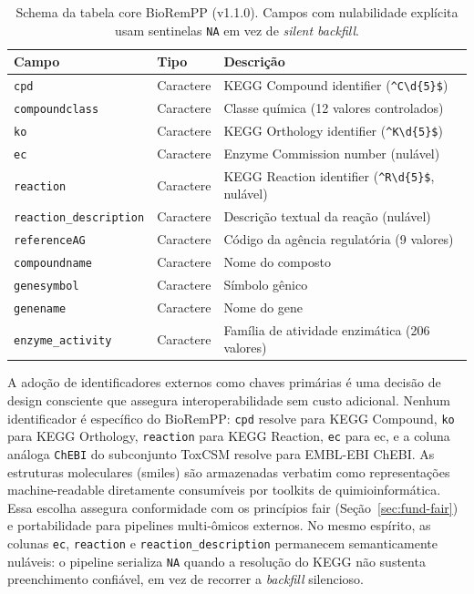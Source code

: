 \begin{table}[htbp]
\centering
\caption{Schema da tabela core BioRemPP (v1.1.0). Campos com nulabilidade explícita usam sentinelas \texttt{NA} em vez de \textit{silent backfill}.}
\label{tab:c1-schema}
\small
\begin{tabularx}{\textwidth}{@{}llX@{}}
\toprule
\textbf{Campo} & \textbf{Tipo} & \textbf{Descrição} \\
\midrule
\texttt{cpd}                  & Caractere & KEGG Compound identifier (\texttt{\^{}C\textbackslash d\{5\}\$}) \\
\texttt{compoundclass}        & Caractere & Classe química (12 valores controlados) \\
\texttt{ko}                   & Caractere & KEGG Orthology identifier (\texttt{\^{}K\textbackslash d\{5\}\$}) \\
\texttt{ec}                   & Caractere & Enzyme Commission number (nulável) \\
\texttt{reaction}             & Caractere & KEGG Reaction identifier (\texttt{\^{}R\textbackslash d\{5\}\$}, nulável) \\
\texttt{reaction\_description}& Caractere & Descrição textual da reação (nulável) \\
\texttt{referenceAG}          & Caractere & Código da agência regulatória (9 valores) \\
\texttt{compoundname}         & Caractere & Nome do composto \\
\texttt{genesymbol}           & Caractere & Símbolo gênico \\
\texttt{genename}             & Caractere & Nome do gene \\
\texttt{enzyme\_activity}     & Caractere & Família de atividade enzimática (206 valores) \\
\bottomrule
\end{tabularx}
\end{table}

A adoção de identificadores externos como chaves primárias é uma decisão de design consciente que assegura interoperabilidade sem custo adicional. Nenhum identificador é específico do BioRemPP: \texttt{cpd} resolve para KEGG Compound, \texttt{ko} para KEGG Orthology, \texttt{reaction} para KEGG Reaction, \texttt{ec} para \gls{ec}, e a coluna análoga \texttt{ChEBI} do subconjunto ToxCSM resolve para EMBL-EBI ChEBI. As estruturas moleculares (\gls{smiles}) são armazenadas verbatim como representações machine-readable diretamente consumíveis por toolkits de quimioinformática. Essa escolha assegura conformidade com os princípios \gls{fair} (Seção~\ref{sec:fund-fair}) e portabilidade para pipelines multi-ômicos externos. No mesmo espírito, as colunas \texttt{ec}, \texttt{reaction} e \texttt{reaction\_description} permanecem semanticamente nuláveis: o pipeline serializa \texttt{NA} quando a resolução do KEGG não sustenta preenchimento confiável, em vez de recorrer a \textit{backfill} silencioso.

